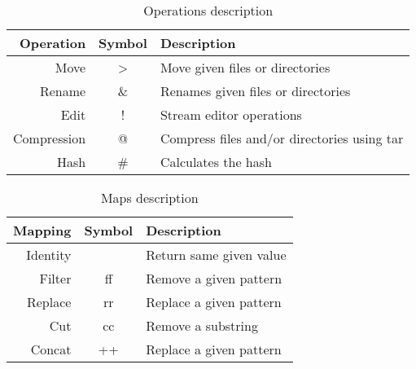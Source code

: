 \documentclass{article}
\begin{document}
\begin{table}[ht]
\centering
\caption{Operations description}
\label{tab:operations}
\begin{tabular}{|r|c|l|}
\hline
Operation   & Symbol & Description\\ \hline
Move        & >      & Move given files or directories \\
Rename      & \&     & Renames given files or directories \\
Edit        & !      & Stream editor operations \\
Compression & @      & Compress files and/or directories using tar \\
Hash        & \#     & Calculates the hash \\
\hline
\end{tabular}
\end{table}

\begin{table}[ht]
\centering
\caption{Maps description}
\label{tab:maps}
\begin{tabular}{|r|c|l|}
\hline
Mapping   & Symbol & Description\\ \hline
Identity  &        & Return same given value \\
Filter    & ff     & Remove a given pattern \\
Replace   & rr     & Replace a given pattern \\
Cut       & cc     & Remove a substring \\
Concat    & ++     & Replace a given pattern \\
\hline
\end{tabular}
\end{table}



\end{document}
